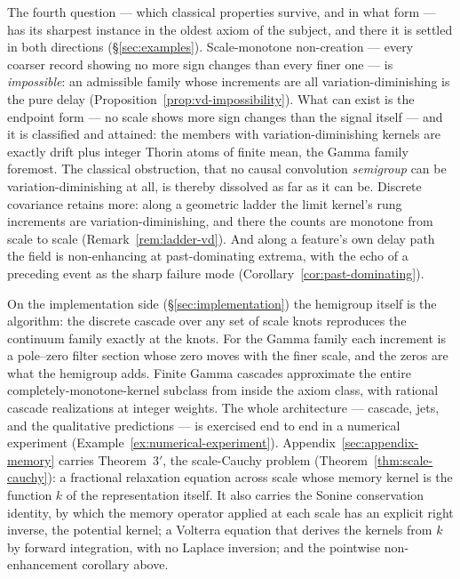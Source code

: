 The fourth question --- which classical properties survive, and in what form --- has its
sharpest instance in the oldest axiom of the subject, and there it is settled in both
directions (\S\ref{sec:examples}). Scale-monotone non-creation --- every coarser record
showing no more sign changes than every finer one --- is \emph{impossible}: an admissible
family whose increments are all variation-diminishing is the pure delay
(Proposition~\ref{prop:vd-impossibility}). What can exist is the endpoint form --- no
scale shows more sign changes than the signal itself --- and it is classified and
attained: the members with variation-diminishing kernels are exactly drift plus integer
Thorin atoms of finite mean, the Gamma family foremost. The classical obstruction,
that no causal convolution \emph{semigroup} can be variation-diminishing at all, is
thereby dissolved as far as it can be. Discrete covariance retains more: along a
geometric ladder the limit kernel's rung increments are variation-diminishing, and there
the counts are monotone from scale to scale (Remark~\ref{rem:ladder-vd}). And along a
feature's own delay path the field is
non-enhancing at past-dominating extrema, with the echo of a preceding event as the sharp
failure mode (Corollary~\ref{cor:past-dominating}).

On the implementation side
(\S\ref{sec:implementation}) the hemigroup itself is the algorithm: the discrete cascade
over any set of scale knots reproduces the continuum family exactly at the knots. For the
Gamma family each increment is a pole--zero filter section whose zero moves with the finer
scale, and the zeros are what the hemigroup adds. Finite Gamma cascades
approximate the entire completely-monotone-kernel subclass from inside the axiom class, with
rational cascade realizations at integer weights. The whole architecture --- cascade, jets,
and the qualitative predictions --- is exercised end to end in a numerical experiment
(Example~\ref{ex:numerical-experiment}).
Appendix~\ref{sec:appendix-memory} carries Theorem~$3'$, the scale-Cauchy
problem (Theorem~\ref{thm:scale-cauchy}): a fractional relaxation equation across scale
whose memory kernel is the function $k$ of the representation itself. It also carries the
Sonine conservation identity, by which the memory operator applied at each scale has an
explicit right inverse, the potential kernel; a Volterra equation that derives the kernels from
$k$ by forward integration, with no Laplace inversion; and the pointwise non-enhancement
corollary above.

